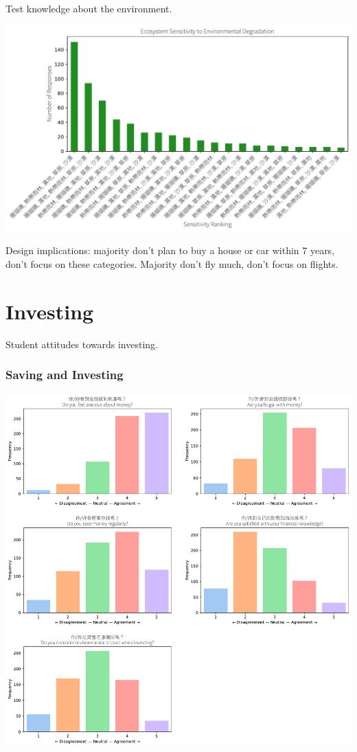 \documentclass[
  letterpaper,
  DIV=11,
  numbers=noendperiod]{scrartcl}
\begin{document}
Test knowledge about the environment.

\includegraphics{_thesis_files/figure-pdf/cell-77-output-1.pdf}

Design implications: majority don't plan to buy a house or car within 7
years, don't focus on these categories. Majority don't fly much, don't
focus on flights.

\newpage

\section{Investing}\label{investing-1}

Student attitudes towards investing.

\subsubsection{Saving and Investing}\label{saving-and-investing}

\includegraphics{_thesis_files/figure-pdf/cell-79-output-1.pdf}
\end{document}
